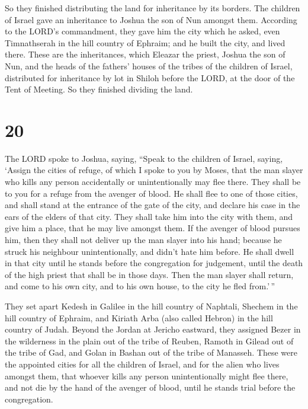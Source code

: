  So they finished distributing the land for inheritance
by its borders. The children of Israel gave an inheritance to Joshua the
son of Nun amongst them.  According to the LORD's
commandment, they gave him the city which he asked, even Timnathserah in
the hill country of Ephraim; and he built the city, and lived there.
 These are the inheritances, which Eleazar the priest,
Joshua the son of Nun, and the heads of the fathers' houses of the
tribes of the children of Israel, distributed for inheritance by lot in
Shiloh before the LORD, at the door of the Tent of Meeting. So they
finished dividing the land.

\hypertarget{section-19}{%
\section{20}\label{section-19}}

 The LORD spoke to Joshua, saying,  ``Speak
to the children of Israel, saying, `Assign the cities of refuge, of
which I spoke to you by Moses,  that the man slayer who
kills any person accidentally or unintentionally may flee there. They
shall be to you for a refuge from the avenger of blood. 
He shall flee to one of those cities, and shall stand at the entrance of
the gate of the city, and declare his case in the ears of the elders of
that city. They shall take him into the city with them, and give him a
place, that he may live amongst them.  If the avenger of
blood pursues him, then they shall not deliver up the man slayer into
his hand; because he struck his neighbour unintentionally, and didn't
hate him before.  He shall dwell in that city until he
stands before the congregation for judgement, until the death of the
high priest that shall be in those days. Then the man slayer shall
return, and come to his own city, and to his own house, to the city he
fled from.'\,''

 They set apart Kedesh in Galilee in the hill country of
Naphtali, Shechem in the hill country of Ephraim, and Kiriath Arba (also
called Hebron) in the hill country of Judah.  Beyond the
Jordan at Jericho eastward, they assigned Bezer in the wilderness in the
plain out of the tribe of Reuben, Ramoth in Gilead out of the tribe of
Gad, and Golan in Bashan out of the tribe of Manasseh. 
These were the appointed cities for all the children of Israel, and for
the alien who lives amongst them, that whoever kills any person
unintentionally might flee there, and not die by the hand of the avenger
of blood, until he stands trial before the congregation.

